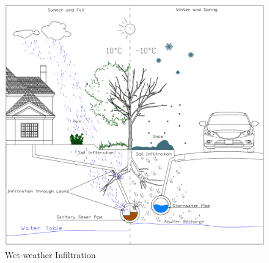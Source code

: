 \begin{figure}[ht]
    \centering
	\includegraphics[scale=0.62]{figures/sanitary_sewer_leakage.png}
	\caption{Wet-weather Infiltration}
	\label{fig:wetinf}
\end{figure}


